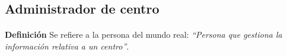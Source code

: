 \subsection{Administrador de centro}

  \paragraph{}\textbf{Definición} Se refiere a la persona del mundo real:
  \emph{``Persona  que gestiona la información relativa a un centro''}.




